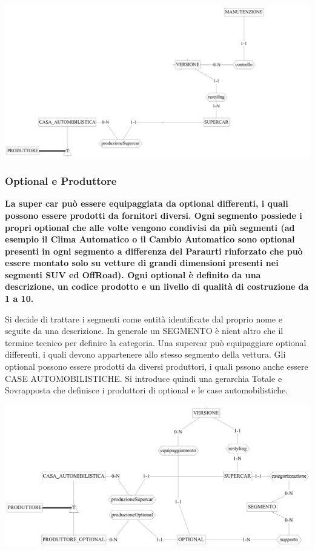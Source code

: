 \documentclass[11pt]{article}
\begin{document}
\begin{center}
    \includegraphics[width=\linewidth]{images/partialSchemes/versione.png}
\end{center}

\subsubsection{Optional e Produttore}
\textbf{La super car può essere equipaggiata da optional differenti, i quali
possono essere prodotti da fornitori diversi. Ogni segmento possiede i propri
optional che alle volte vengono condivisi da più segmenti (ad esempio il Clima
Automatico o il Cambio Automatico sono optional presenti in ogni segmento a
differenza del Paraurti rinforzato che può essere montato solo su vetture di
grandi dimensioni presenti nei segmenti SUV ed OffRoad). Ogni optional è
definito da una descrizione, un codice prodotto e un livello di qualità di
costruzione da 1 a 10.}

Si decide di trattare i segmenti come entità identificate dal proprio nome e
seguite da una descrizione. In generale un SEGMENTO è nient altro che il termine
tecnico per definire la categoria. Una supercar può equipaggiare optional
differenti, i quali devono appartenere allo stesso segmento della vettura. Gli
optional possono essere prodotti da diversi produttori, i quali pssono anche
essere CASE AUTOMOBILISTICHE. Si introduce quindi una gerarchia Totale e
Sovrapposta che definisce i produttori di optional e le case automobilistiche.

\begin{center}
    \includegraphics[width=\linewidth]{images/partialSchemes/optional.png}
\end{center}
\end{document}
